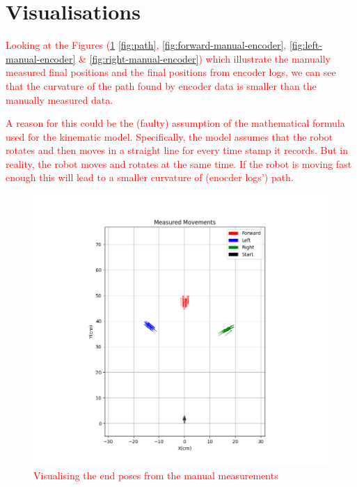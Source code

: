   {
    \section{Visualisations}
    
    \begin{itemize}
        \item[1.] \textcolor{red}{Looking at the Figures (\ref{fig:end-poses} \ref{fig:path}, \ref{fig:forward-manual-encoder}, \ref{fig:left-manual-encoder} \& \ref{fig:right-manual-encoder}) which illustrate the manually measured final positions and the final positions from encoder logs, we can see that the curvature of the path found by encoder data is smaller than the manually measured data. 
        \item[2.] A reason for this could be the (faulty) assumption of the mathematical formula used for the kinematic model. Specifically, the model assumes that the robot rotates and then moves in a straight line for every time stamp it records. But in reality, the robot moves and rotates at the same time. If the robot is moving fast enough this will lead to a smaller curvature of (enocder logs') path.}
    \end{itemize}
    
        \begin{figure}[!ht] 
            \centering \includegraphics[scale=.70]{"images/experiment_2/1.end-poses.png"}
            \caption{\textcolor{red}{Visualising the end poses from the manual measurements}}
            \label{fig:end-poses}
        \end{figure}
        
}
